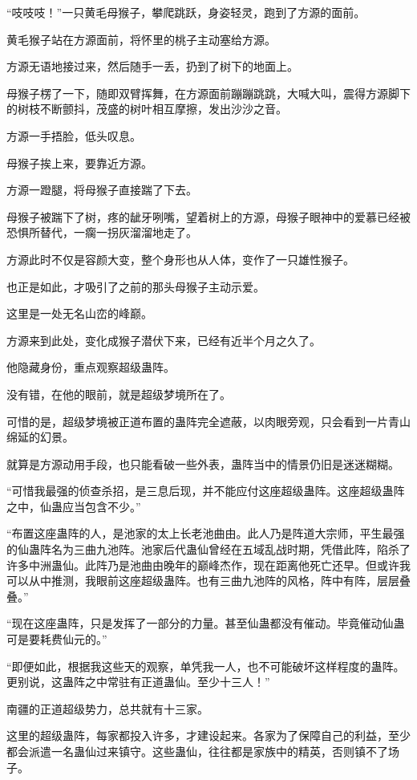 
\begin{this_body}

“吱吱吱！”一只黄毛母猴子，攀爬跳跃，身姿轻灵，跑到了方源的面前。

黄毛猴子站在方源面前，将怀里的桃子主动塞给方源。

方源无语地接过来，然后随手一丢，扔到了树下的地面上。

母猴子楞了一下，随即双臂挥舞，在方源面前蹦蹦跳跳，大喊大叫，震得方源脚下的树枝不断颤抖，茂盛的树叶相互摩擦，发出沙沙之音。

方源一手捂脸，低头叹息。

母猴子挨上来，要靠近方源。

方源一蹬腿，将母猴子直接踹了下去。

母猴子被踹下了树，疼的龇牙咧嘴，望着树上的方源，母猴子眼神中的爱慕已经被恐惧所替代，一瘸一拐灰溜溜地走了。

方源此时不仅是容颜大变，整个身形也从人体，变作了一只雄性猴子。

也正是如此，才吸引了之前的那头母猴子主动示爱。

这里是一处无名山峦的峰巅。

方源来到此处，变化成猴子潜伏下来，已经有近半个月之久了。

他隐藏身份，重点观察超级蛊阵。

没有错，在他的眼前，就是超级梦境所在了。

可惜的是，超级梦境被正道布置的蛊阵完全遮蔽，以肉眼旁观，只会看到一片青山绵延的幻景。

就算是方源动用手段，也只能看破一些外表，蛊阵当中的情景仍旧是迷迷糊糊。

“可惜我最强的侦查杀招，是三息后现，并不能应付这座超级蛊阵。这座超级蛊阵之中，仙蛊应当包含不少。”

“布置这座蛊阵的人，是池家的太上长老池曲由。此人乃是阵道大宗师，平生最强的仙蛊阵名为三曲九池阵。池家后代蛊仙曾经在五域乱战时期，凭借此阵，陷杀了许多中洲蛊仙。此阵乃是池曲由晚年的巅峰杰作，现在距离他死亡还早。但或许我可以从中推测，我眼前这座超级蛊阵。也有三曲九池阵的风格，阵中有阵，层层叠叠。”

“现在这座蛊阵，只是发挥了一部分的力量。甚至仙蛊都没有催动。毕竟催动仙蛊可是要耗费仙元的。”

“即便如此，根据我这些天的观察，单凭我一人，也不可能破坏这样程度的蛊阵。更别说，这蛊阵之中常驻有正道蛊仙。至少十三人！”

南疆的正道超级势力，总共就有十三家。

这里的超级蛊阵，每家都投入许多，才建设起来。各家为了保障自己的利益，至少都会派遣一名蛊仙过来镇守。这些蛊仙，往往都是家族中的精英，否则镇不了场子。


\end{this_body}
